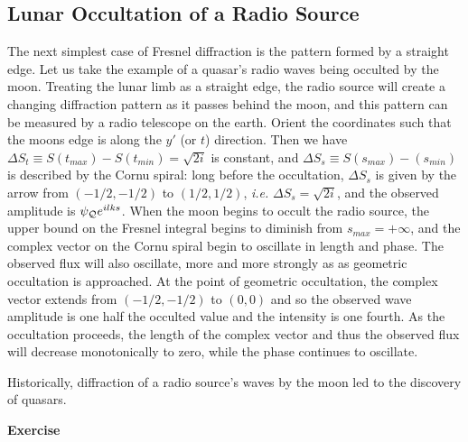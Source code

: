 \subsection{Lunar Occultation of a Radio Source}

The next simplest case of Fresnel diffraction is the pattern formed by a straight 
edge. Let us take the example of a quasar's radio waves being occulted by the 
moon.
Treating the lunar limb as a straight edge, the radio source will create
a changing diffraction pattern as it passes behind the moon, and this pattern
can be measured by a radio telescope on the earth. Orient the coordinates
such that the moons edge is along the $y'$ (or $t$) direction. Then we have
$\Delta S_t\equiv S(t_{max})-S(t_{min})=\sqrt{2i}$ is constant, and 
$\Delta S_s\equiv S(s_{max})-(s_{min})$ is described by the Cornu spiral: long
before the occultation, $\Delta S_s$ is given by the arrow from $(-{1/2},-{1/2})$
to $({1/2},{1/2})$, {\it i.e.} $\Delta S_s=\sqrt{2i}$, and the observed amplitude
is $\psi_{\cal{Q}}e^{ilks}$. When the moon begins to occult the radio source, the
upper bound on the Fresnel integral begins to diminish from $s_{max}=+\infty$, 
and the complex vector on the Cornu spiral begin to oscillate in length and 
phase. The observed flux will also oscillate, more and more strongly as as 
geometric occultation is approached. At the point of geometric occultation, the
complex vector extends from $(-{1/2},-{1/2})$ to $(0,0)$ and so the observed
wave amplitude is one half the occulted value and the intensity is one fourth. 
As the occultation proceeds, the length of the complex vector and thus the 
observed flux will decrease monotonically to zero, while the phase continues to
oscillate.

Historically, diffraction of a radio source's waves by the moon led to the 
discovery of quasars. 

{\bf Exercise}

